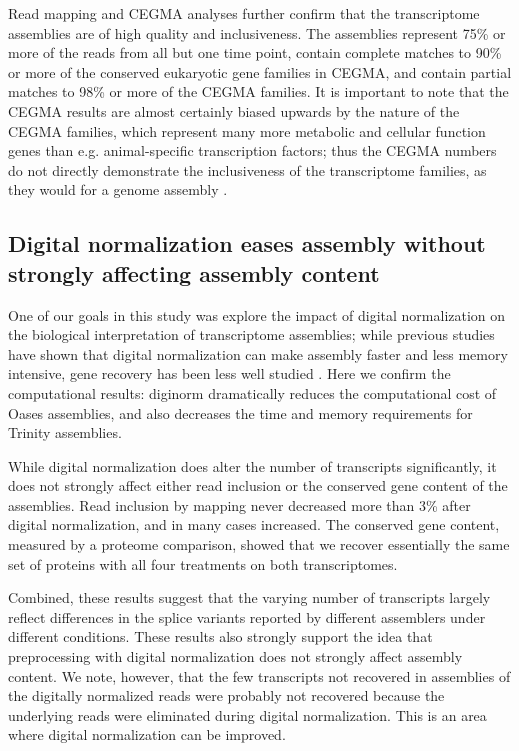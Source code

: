 Read mapping and CEGMA analyses further confirm that the transcriptome assemblies are of high quality and inclusiveness.  The assemblies represent 75\% or more of the reads from all but one time point, contain complete matches to 90\% or more of the conserved eukaryotic gene families in CEGMA, and contain partial matches to 98\% or more of the CEGMA families.   It is important to note that the CEGMA results are almost certainly biased upwards by the nature of the CEGMA families, which represent many more metabolic and cellular function genes than e.g. animal-specific transcription factors; thus the CEGMA numbers do not directly demonstrate the inclusiveness of the transcriptome families, as they would for a genome assembly \citep{parra_cegma:_2007}.

\subsection{Digital normalization eases assembly without strongly affecting assembly content}

One of our goals in this study was explore the impact of digital normalization on the biological interpretation of transcriptome assemblies; while previous studies have shown that digital normalization can make assembly faster and less memory intensive, gene recovery has been less well studied \citep{haas_novo_2013, brown_reference-free_2012}.  Here we confirm the computational results: diginorm dramatically reduces the computational cost of Oases assemblies, and also decreases the time and memory requirements for Trinity assemblies.

While digital normalization does alter the number of transcripts significantly, it does not strongly affect either read inclusion or the conserved gene content of the assemblies. Read inclusion by mapping never decreased more than 3\% after digital normalization, and in many cases increased. The conserved gene content, measured by a proteome comparison, showed that we recover essentially the same set of proteins with all four treatments on both transcriptomes.  

Combined, these results suggest that the varying number of transcripts largely reflect differences in the splice variants reported by different assemblers under different conditions. These results also strongly support the idea that preprocessing with digital normalization does not strongly affect assembly content.  We note, however, that the few transcripts not recovered in assemblies of the digitally normalized reads were probably not recovered because the underlying reads were eliminated during digital normalization.  This is an area where digital normalization can be improved.

